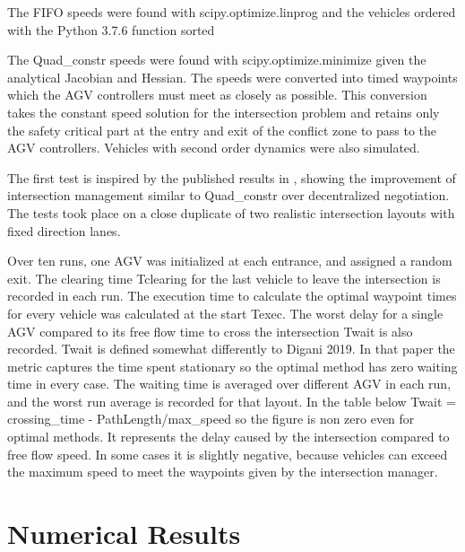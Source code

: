 \documentclass[11pt]{article} %
\begin{document}
The FIFO speeds were found with scipy.optimize.linprog and the vehicles ordered with the Python 3.7.6 function sorted

The Quad\_constr speeds were found with scipy.optimize.minimize given the analytical Jacobian and Hessian.
The speeds were converted into timed waypoints which the AGV controllers must meet as closely as possible. This conversion takes the constant speed solution for the intersection problem and retains only the safety critical part at the entry and exit of the conflict zone to pass to the AGV controllers. Vehicles with second order dynamics were also simulated.

The first test is inspired by the published results in \cite{Digani2019}, showing the improvement of intersection management similar to Quad\_constr over decentralized negotiation. The tests took place on a close duplicate of two realistic intersection layouts with fixed direction lanes.

Over ten runs, one AGV was initialized at each entrance, and assigned a random exit.   The clearing time Tclearing for the last vehicle to leave the intersection is recorded in each run. The execution time to calculate the optimal waypoint times for every vehicle was calculated at the start Texec. The worst delay for a single AGV compared to its free flow time to cross the intersection Twait is also recorded.
Twait is defined somewhat differently to Digani 2019. In that paper the metric captures the time spent stationary so the optimal method has zero waiting time in every case. The waiting time is averaged over different AGV in each run, and the worst run average is recorded for that layout.
In the table below Twait = crossing\_time - PathLength/max\_speed so the figure is non zero even for optimal methods. It represents the delay caused by the intersection compared to free flow speed. In some cases it is slightly negative, because vehicles can exceed the maximum speed to meet the waypoints given by the intersection manager.   
\section{Numerical Results}


\end{document}
